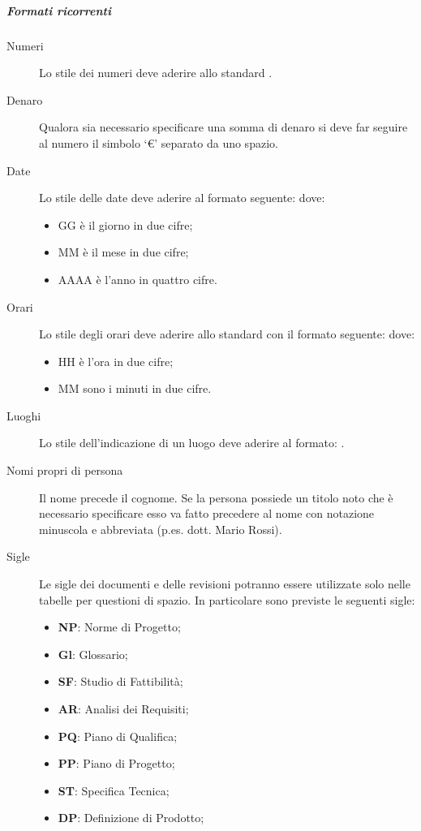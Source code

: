 \documentclass[a4paper, titlepage]{article}
\begin{document}
\subparagraph{Formati ricorrenti}
\begin{description}
	\item[Numeri] 
	Lo stile dei numeri deve aderire allo standard .
	\item[Denaro] 
	Qualora sia necessario specificare una somma di denaro si deve far seguire al numero il simbolo `\euro' separato da uno spazio.
	\item[Date] 
	Lo stile delle date deve aderire al formato seguente:
	dove:
	\begin{itemize}
		\item GG è il giorno in due cifre;
		\item MM è il mese in due cifre;
		\item AAAA è l'anno in quattro cifre.
	\end{itemize}
	\item[Orari] 
	Lo stile degli orari deve aderire allo standard  con il formato seguente:
	dove:
	\begin{itemize}
		\item HH è l'ora in due cifre;
		\item MM sono i minuti in due cifre.
	\end{itemize}
	\item[Luoghi] 
	Lo stile dell'indicazione di un luogo deve aderire al formato:
	.
	\item[Nomi propri di persona] 
	Il nome precede il cognome. Se la persona possiede un titolo noto che è necessario specificare esso va fatto precedere al nome con notazione minuscola e abbreviata (p.es. dott. Mario Rossi).
	\item[Sigle] 
	Le sigle dei documenti e delle revisioni potranno essere utilizzate solo nelle tabelle per questioni di spazio. In particolare sono previste le seguenti sigle:
	\begin{itemize}
		\item \textbf{NP}: Norme di Progetto;
		\item \textbf{Gl}: Glossario;
		\item \textbf{SF}: Studio di Fattibilità;
		\item \textbf{AR}: Analisi dei Requisiti;
		\item \textbf{PQ}: Piano di Qualifica;
		\item \textbf{PP}: Piano di Progetto;
		\item \textbf{ST}: Specifica Tecnica;
		\item \textbf{DP}: Definizione di Prodotto;

\end{itemize}
\end{description}
\end{document}
